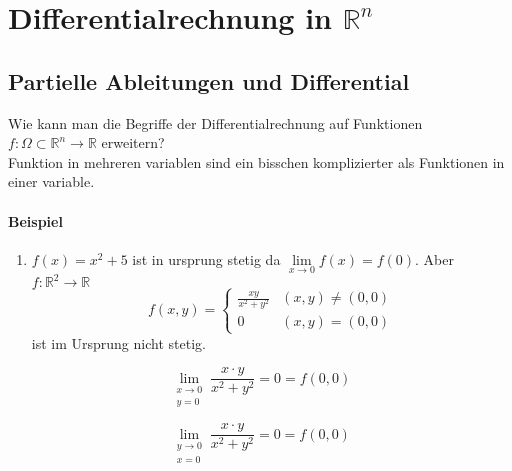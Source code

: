 \chapter{Differentialrechnung in $\mathbb{R}^n$}
\section{Partielle Ableitungen und Differential}
Wie kann man die Begriffe der  Differentialrechnung auf Funktionen $f:\Omega \subset \mathbb{R}^n\rightarrow\mathbb{R}$ erweitern?\\

Funktion in mehreren variablen sind ein bisschen komplizierter als Funktionen in einer variable.
\subsubsection*{Beispiel}
\begin{enumerate}
\item $f(x)=x^2+5$ ist in ursprung stetig da $\lim\limits_{x\rightarrow 0}f(x)=f(0)$. Aber $f:\mathbb{R}^2\rightarrow\mathbb{R}$ \[f(x,y) = \left\{ {\begin{array}{*{20}{c}}
{\frac{{xy}}{{{x^2} + {y^2}}}}&{(x,y)\not  = (0,0)}\\
0&{(x,y) = (0,0)}
\end{array}} \right.\] ist im Ursprung nicht stetig. %
\end{enumerate}
\begin{figure}[ht]
\begin{minipage}[b]{0.45\linewidth}
\centering
\[\mathop {\lim }\limits_{\begin{array}{*{20}{c}}
{x \to 0}\\
{y = 0}
\end{array}} \frac{{x \cdot y}}{{{x^2} + {y^2}}} = 0 = f(0,0)\]
\end{minipage}
\hspace{0.5cm}
\begin{minipage}[b]{0.45\linewidth}
\centering
\[\mathop {\lim }\limits_{\begin{array}{*{20}{c}}
{y \to 0}\\
{x = 0}
\end{array}} \frac{{x \cdot y}}{{{x^2} + {y^2}}} = 0 = f(0,0)\]
\end{minipage}
\end{figure}


